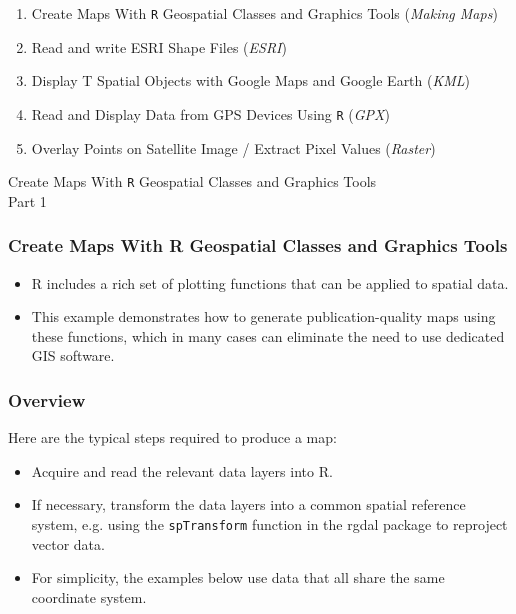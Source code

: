 \documentclass{beamer}
\begin{document}
\begin{frame}
\Large
\begin{enumerate}
\item Create Maps With \texttt{R} Geospatial Classes and Graphics Tools (\textit{Making Maps})
\item Read and write ESRI Shape Files (\textit{ESRI})
\item Display T Spatial Objects with Google Maps and Google Earth (\textit{KML})
\item Read and Display Data from GPS Devices Using \texttt{R} (\textit{GPX})
\item Overlay Points on Satellite Image / Extract Pixel Values (\textit{Raster})
\end{enumerate}
\end{frame}

\begin{frame}
\huge
Create Maps With \texttt{R} Geospatial Classes and Graphics Tools
\\ Part 1
\end{frame}
\begin{frame}
\frametitle{Create Maps With R Geospatial Classes and Graphics Tools}
\begin{itemize}

\item R includes a rich set of plotting functions that can be applied to spatial data. \item This example demonstrates how to generate publication-quality maps using these functions, which in many cases can eliminate the need to use dedicated GIS software.

\end{itemize}
\end{frame}
\begin{frame}
\frametitle{Overview}
Here are the typical steps required to produce a map:

\begin{itemize}


\item Acquire and read the relevant data layers into R.
\item If necessary, transform the data layers into a common spatial reference system, e.g. using the \texttt{spTransform} function in the rgdal package to reproject vector data. \item For simplicity, the examples below use data that all share the same coordinate system.

\end{itemize}
\end{frame}
\end{document}
